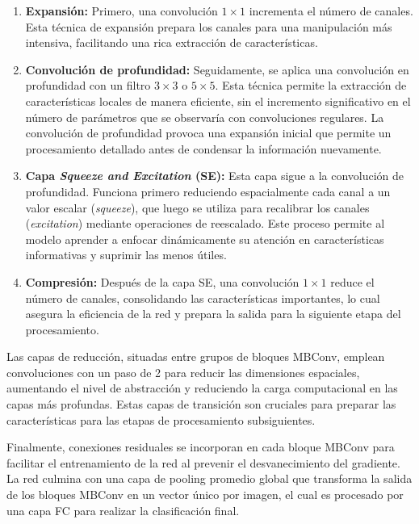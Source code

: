 \begin{enumerate}
	\item \textbf{Expansión:} Primero, una convolución \(1 \times 1\) incrementa el número de canales. Esta técnica de expansión prepara los canales para una manipulación más intensiva, facilitando una rica extracción de características.
	
	\item \textbf{Convolución de profundidad:} Seguidamente, se aplica una convolución en profundidad con un filtro \(3 \times 3\) o \(5 \times 5\). Esta técnica permite la extracción de características locales de manera eficiente, sin el incremento significativo en el número de parámetros que se observaría con convoluciones regulares. La convolución de profundidad provoca una expansión inicial que permite un procesamiento detallado antes de condensar la información nuevamente.
	
	\item \textbf{Capa \textit{Squeeze and Excitation} (SE):} Esta capa sigue a la convolución de profundidad. Funciona primero reduciendo espacialmente cada canal a un valor escalar (\textit{squeeze}), que luego se utiliza para recalibrar los canales (\textit{excitation}) mediante operaciones de reescalado. Este proceso permite al modelo aprender a enfocar dinámicamente su atención en características informativas y suprimir las menos útiles.
	
	\item \textbf{Compresión:} Después de la capa SE, una convolución \(1 \times 1\) reduce el número de canales, consolidando las características importantes, lo cual asegura la eficiencia de la red y prepara la salida para la siguiente etapa del procesamiento.
\end{enumerate}

Las capas de reducción, situadas entre grupos de bloques MBConv, emplean convoluciones con un paso de 2 para reducir las dimensiones espaciales, aumentando el nivel de abstracción y reduciendo la carga computacional en las capas más profundas. Estas capas de transición son cruciales para preparar las características para las etapas de procesamiento subsiguientes.

Finalmente, conexiones residuales se incorporan en cada bloque MBConv para facilitar el entrenamiento de la red al prevenir el desvanecimiento del gradiente. La red culmina con una capa de pooling promedio global que transforma la salida de los bloques MBConv en un vector único por imagen, el cual es procesado por una capa FC para realizar la clasificación final.

